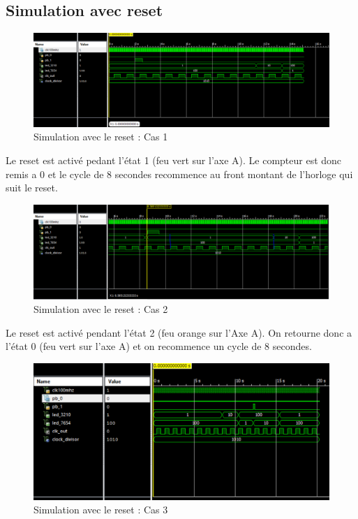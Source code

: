 \documentclass[11pt]{report}
\begin{document}
\subsection{Simulation avec reset}

\begin{figure}[h]
\includegraphics[width=13cm]{TP03-6.PNG}
\caption{Simulation avec le reset : Cas 1}
\end{figure}

Le reset est activé pedant l'état 1 (feu vert sur l'axe A).
Le compteur est donc remis a 0 et le cycle de 8 secondes recommence au front montant de l'horloge qui suit le reset.

\begin{figure}[h]
\includegraphics[width=13cm]{TP03-7.PNG}
\caption{Simulation avec le reset : Cas 2}
\end{figure}

Le reset est activé pendant l'état 2 (feu orange sur l'Axe A).
On retourne donc a l'état 0 (feu vert sur l'axe A) et on recommence un cycle de 8 secondes.

\begin{figure}[!h]
\includegraphics[width=13cm]{TP03-8.PNG}
\caption{Simulation avec le reset : Cas 3}
\end{figure}
\end{document}
